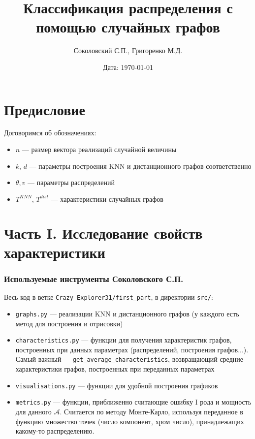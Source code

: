 \documentclass[a4paper,12pt]{article}
\title{\textbf{Классификация распределения с помощью случайных графов}}
\author{Соколовский С.П., Григоренко М.Д.}
\date{Дата: \today}
\begin{document}
\maketitle

\section{Предисловие}
Договоримся об обозначениях: \begin{itemize}
    \item $n$ --- размер вектора реализаций случайной величины
    \item $k$, $d$ --- параметры построения KNN и дистанционного графов соответственно
    \item $\theta, v$ --- параметры распределений
    \item $T^{KNN}$, $T^{dist}$ --- характеристики случайных графов
\end{itemize}

\section{Часть I. Исследование свойств характеристики}
\subsubsection*{Используемые инструменты Соколовского С.П.}
Весь код в ветке \texttt{Crazy-Explorer31/first\_part}, в директории \texttt{src/}:
\begin{itemize}
    \item \texttt{graphs.py} --- реализации KNN и дистанционного графов (у каждого есть метод для построения и отрисовки)
    \item \texttt{characteristics.py} --- функции для получения характеристик графов, построенных при данных параметрах (распределений, построения графов...). Самый важный --- \texttt{get\_average\_characteristics}, возвращающий средние характеристики графов, построенных при переданных параметрах
    \item \texttt{visualisations.py} --- функции для удобной построения графиков
    \item \texttt{metrics.py} --- функции, приближенно считающие ошибку I рода и мощность для данного $\mathcal{A}$. Считается по методу Монте-Карло, используя переданное в функцию множество точек (число компонент, хром число), принадлежащих какому-то распределению.
\end{itemize}
\end{document}
